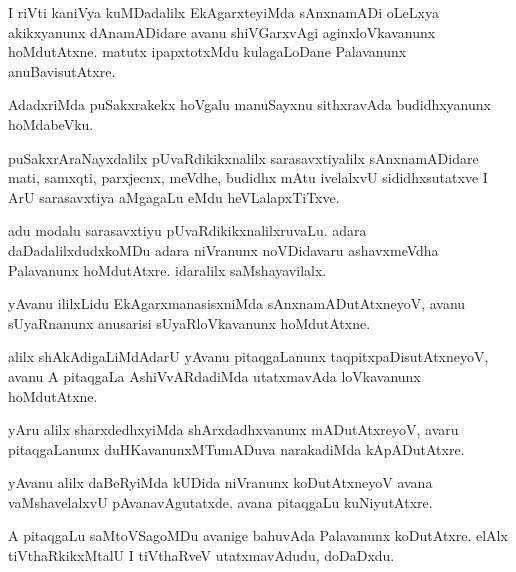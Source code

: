 \documentclass{article}
\begin{document}
\begin{mn}
I riVti  kaniVya  kuMDadalilx  EkAgarxteyiMda  sAnxnamADi  oLeLxya  akikxyanunx  
dAnamADidare  avanu  shiVGarxvAgi  aginxloVkavanunx  hoMdutAtxne.  matutx  
ipapxtotxMdu  kulagaLoDane  Palavanunx  anuBavisutAtxre.
\end{mn}

\begin{mn}
AdadxriMda  puSakxrakekx  hoVgalu  manuSayxnu  sithxravAda  budidhxyanunx  hoMdabeVku.
\end{mn}

\begin{mn}
puSakxrAraNayxdalilx  pUvaRdikikxnalilx  sarasavxtiyalilx  sAnxnamADidare  
mati,  samxqti,  parxjecnx,  meVdhe,  budidhx  mAtu  ivelalxvU  sididhxsutatxve  
I  ArU  sarasavxtiya  aMgagaLu  eMdu  heVLalapxTiTxve.
\end{mn}

\begin{mn}
adu  modalu  sarasavxtiyu  pUvaRdikikxnalilxruvaLu.  adara  daDadalilxdudxkoMDu  adara  
niVranunx  noVDidavaru  ashavxmeVdha  Palavanunx  hoMdutAtxre.  idaralilx  saMshayavilalx.
\end{mn}

\begin{mn}
yAvanu  ililxLidu  EkAgarxmanasisxniMda  sAnxnamADutAtxneyoV,  avanu  
sUyaRnanunx  anusarisi  sUyaRloVkavanunx  hoMdutAtxne.
\end{mn}

\begin{mn}
alilx  shAkAdigaLiMdAdarU  yAvanu  pitaqgaLanunx  taqpitxpaDisutAtxneyoV,  
avanu  A  pitaqgaLa  AshiVvARdadiMda  utatxmavAda  loVkavanunx  hoMdutAtxne.
\end{mn}

\begin{mn}
yAru  alilx  sharxdedhxyiMda  shArxdadhxvanunx  mADutAtxreyoV,  avaru  
pitaqgaLanunx  duHKavanunxMTumADuva  narakadiMda  kApADutAtxre.
\end{mn}

\begin{mn}
yAvanu  alilx  daBeRyiMda  kUDida  niVranunx  koDutAtxneyoV  avana 
vaMshavelalxvU pAvanavAgutatxde.  avana  pitaqgaLu  kuNiyutAtxre.
\end{mn}

\begin{mn}
A  pitaqgaLu  saMtoVSagoMDu  avanige  bahuvAda  Palavanunx  koDutAtxre.   
elAlx  tiVthaRkikxMtalU  I  tiVthaRveV  utatxmavAdudu,  doDaDxdu.
\end{mn}
\end{document}
